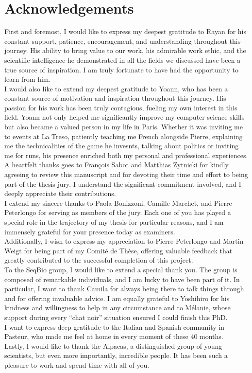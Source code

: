 \section*{Acknowledgements}
First and foremost, I would like to express my deepest gratitude to Rayan for his constant support, patience, encouragement, and understanding throughout this journey. His ability to bring value to our work, his admirable work ethic, and the scientific intelligence he demonstrated in all the fields we discussed have been a true source of inspiration. I am truly fortunate to have had the opportunity to learn from him.\\
I would also like to extend my deepest gratitude to Yoann, who has been a constant source of motivation and inspiration throughout this journey. His passion for his work has been truly contagious, fueling my own interest in this field. Yoann not only helped me significantly improve my computer science skills but also became a valued person in my life in Paris. Whether it was inviting me to events at La Treso, patiently teaching me French alongside Pierre, explaining me the technicalities of the game he invesnts, talking about politics or inviting me for runs, his presence enriched both my personal and professional experiences.\\
A heartfelt thanks goes to François Sabot and Matthias Zytnicki for kindly agreeing to review this manuscript and for devoting their time and effort to being part of the thesis jury. I understand the significant commitment involved, and I deeply appreciate their contributions.\\
I extend my sincere thanks to Paola Bonizzoni, Camille Marchet, and Pierre Peterlongo for serving as members of the jury. Each one of you has played a special role in the trajectory of my thesis for particular reasons, and I am immensely grateful for your presence today as examiners.\\
Additionally, I wish to express my appreciation to Pierre Peterlongo and Martin Weigt for being part of my Comité de Thèse, offering valuable feedback that greatly contributed to the successful completion of this project.\\
To the SeqBio group, I would like to extend a special thank you. The group is composed of remarkable individuals, and I am lucky to have been part of it. In particular, I want to thank Camila for always being there to talk things through and for offering invaluable advice. I am equally grateful to Yoshihiro for his kindness and willingness to help in any circumstance and to Mélanie, whose support during every “chat noir” situation ensured I could finish this PhD.\\
I want to express deep gratitude to the Italian and Spanish community in Pasteur, who made me feel at home in every moment of these 40 months.\\
Lastly, I would like to thank the Alpacas, a distinguished group of young scientists, but even more importantly, incredible people. It has been such a pleasure to work and spend time with all of you.\\

